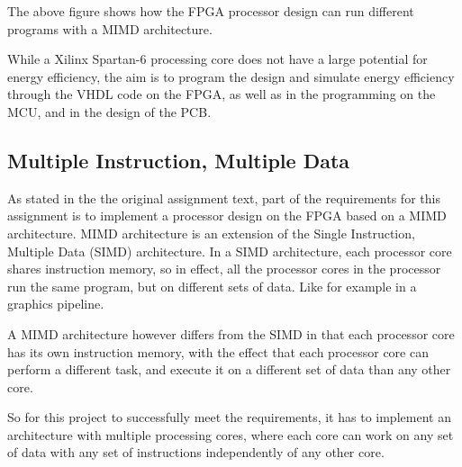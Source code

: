 The above figure shows how the FPGA processor
design can run different programs with a MIMD architecture.

While a Xilinx Spartan-6\cite{fpga-chip} processing core does not have a large
potential for energy efficiency, the aim is to program the  design and simulate
energy efficiency through the VHDL code on the FPGA, as well as in the
programming on the MCU, and in the design of the PCB.

\subsection{Multiple Instruction, Multiple Data}

As stated in the the original assignment text, part of the requirements for this
assignment is to implement a processor design on the FPGA based on a MIMD
architecture. MIMD architecture is an extension of the Single Instruction,
Multiple Data (SIMD) architecture. In a SIMD architecture, each processor core
shares instruction memory, so in effect, all the processor cores in the
processor run the same program, but on different sets of data. Like for example
in a graphics pipeline.

A MIMD architecture however differs from the SIMD in that each processor core
has its own instruction memory, with the effect that each processor core can
perform a different task, and execute it on a different set of data than any
other core.

So for this project to successfully meet the requirements, it has to implement
an architecture with multiple processing cores, where each core can work on any
set of data with any set of instructions independently of any other core.
